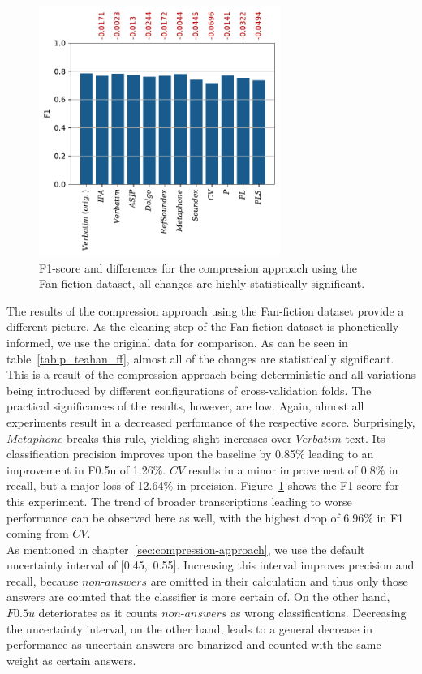 \begin{figure}
  \centering
  \includegraphics[width=0.7\textwidth]{figures/results_f1_ff_teahan}
  \caption{F1-score and differences for the compression approach using the Fan-fiction dataset, all changes are highly statistically significant.}
  \label{fig:results_f1_ff_teahan}
\end{figure}


The results of the compression approach using the Fan-fiction dataset provide a different picture.
As the cleaning step of the Fan-fiction dataset is phonetically-informed, we use the original data for comparison.
As can be seen in table~\ref{tab:p_teahan_ff}, almost all of the changes are statistically significant.
This is a result of the compression approach being deterministic and all variations being introduced by different configurations of cross-validation folds.
The practical significances of the results, however, are low.
Again, almost all experiments result in a decreased perfomance of the respective score.
Surprisingly, $Metaphone$ breaks this rule, yielding slight increases over $Verbatim$ text.
Its classification precision improves upon the baseline by 0.85\% leading to an improvement in F0.5u of 1.26\%.
$CV$ results in a minor improvement of 0.8\% in recall, but a major loss of 12.64\% in precision.
Figure~\ref{fig:results_f1_ff_teahan} shows the F1-score for this experiment.
The trend of broader transcriptions leading to worse performance can be observed here as well, with the highest drop of 6.96\% in F1 coming from $CV$.\\
As mentioned in chapter~\ref{sec:compression-approach}, we use the default uncertainty interval of [0.45,~0.55].
Increasing this interval improves precision and recall, because $non$-$answers$ are omitted in their calculation and thus only those answers are counted that the classifier is more certain of.
On the other hand, $F0.5u$ deteriorates as it counts $non$-$answers$ as wrong classifications.
Decreasing the uncertainty interval, on the other hand, leads to a general decrease in performance as uncertain answers are binarized and counted with the same weight as certain answers.\\

